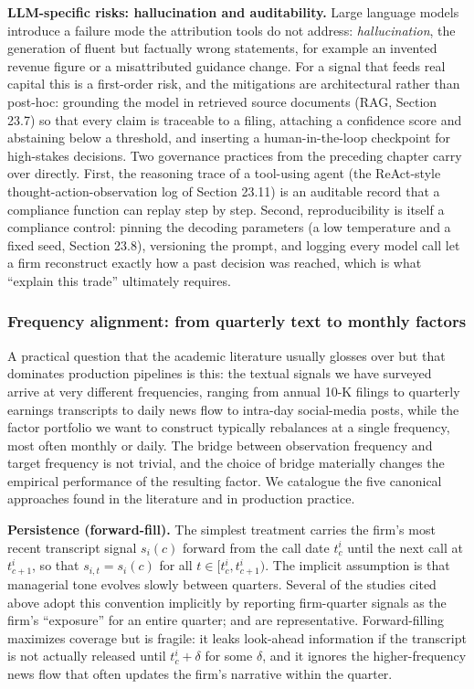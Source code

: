 \textbf{LLM-specific risks: hallucination and auditability.} Large language models introduce a failure mode the attribution tools do not address: \textit{hallucination}, the generation of fluent but factually wrong statements, for example an invented revenue figure or a misattributed guidance change. For a signal that feeds real capital this is a first-order risk, and the mitigations are architectural rather than post-hoc: grounding the model in retrieved source documents (RAG, Section 23.7) so that every claim is traceable to a filing, attaching a confidence score and abstaining below a threshold, and inserting a human-in-the-loop checkpoint for high-stakes decisions. Two governance practices from the preceding chapter carry over directly. First, the reasoning trace of a tool-using agent (the ReAct-style thought-action-observation log of Section 23.11) is an auditable record that a compliance function can replay step by step. Second, reproducibility is itself a compliance control: pinning the decoding parameters (a low temperature and a fixed seed, Section 23.8), versioning the prompt, and logging every model call let a firm reconstruct exactly how a past decision was reached, which is what ``explain this trade'' ultimately requires.

\subsubsection{Frequency alignment: from quarterly text to monthly factors}

A practical question that the academic literature usually glosses over but that dominates production pipelines is this: the textual signals we have surveyed arrive at very different frequencies, ranging from annual 10-K filings to quarterly earnings transcripts to daily news flow to intra-day social-media posts, while the factor portfolio we want to construct typically rebalances at a single frequency, most often monthly or daily. The bridge between observation frequency and target frequency is not trivial, and the choice of bridge materially changes the empirical performance of the resulting factor. We catalogue the five canonical approaches found in the literature and in production practice.

\textbf{Persistence (forward-fill).} The simplest treatment carries the firm's most recent transcript signal $s_i(c)$ forward from the call date $t_c^i$ until the next call at $t_{c+1}^i$, so that $s_{i,t} = s_i(c)$ for all $t \in [t_c^i, t_{c+1}^i)$. The implicit assumption is that managerial tone evolves slowly between quarters. Several of the studies cited above adopt this convention implicitly by reporting firm-quarter signals as the firm's ``exposure'' for an entire quarter; \cite{sautner2023firm} and \cite{hassan2019politicalrisk} are representative. Forward-filling maximizes coverage but is fragile: it leaks look-ahead information if the transcript is not actually released until $t_c^i + \delta$ for some $\delta$, and it ignores the higher-frequency news flow that often updates the firm's narrative within the quarter.

